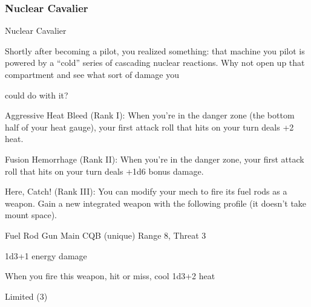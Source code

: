 \subsubsection{Nuclear Cavalier}

                                             Nuclear Cavalier

Shortly after becoming a pilot, you realized something: that machine you pilot is powered by a “cold” series
of cascading nuclear reactions. Why not open up that compartment and see what sort of damage you

could do with it?

Aggressive Heat Bleed  (Rank I): When you’re in the danger zone (the bottom half of your heat
gauge), your first attack roll that hits on your turn deals +2 heat.

Fusion Hemorrhage (Rank II): When you’re in the danger zone, your first attack roll that hits on
your turn deals +1d6 bonus damage.

Here, Catch! (Rank III): You can modify your mech to fire its fuel rods as a weapon. Gain a new
integrated weapon with the following profile (it doesn’t take mount space).

         Fuel Rod Gun
         Main CQB (unique)
         Range 8, Threat 3

         1d3+1 energy damage

         When you fire this weapon, hit or miss, cool 1d3+2 heat

         Limited (3)